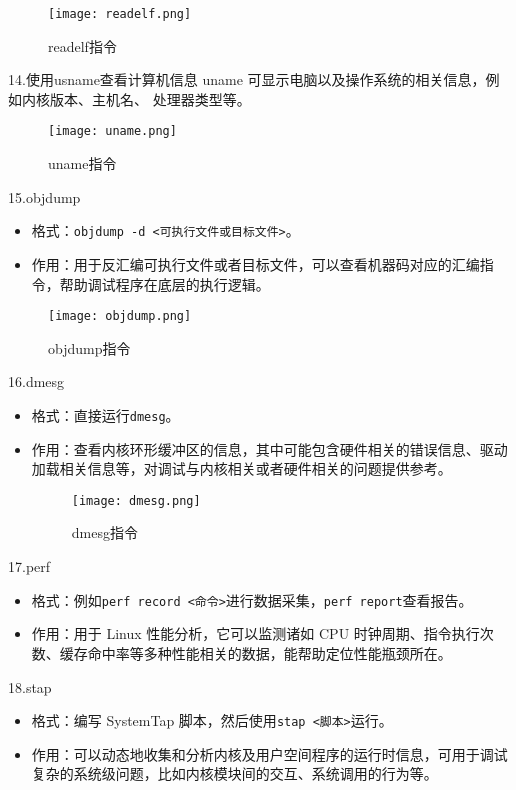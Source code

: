\documentclass{article}
\begin{document}
\begin{figure}[!h]
    \centering
    \texttt{[image: readelf.png]}
    \caption{readelf指令}
    \label{fig:enter-label}
\end{figure}


14.使用usname查看计算机信息
uname 可显示电脑以及操作系统的相关信息，例如内核版本、主机名、 处理器类型等。
\begin{figure}[!h]
    \centering
    \texttt{[image: uname.png]}
    \caption{uname指令}
    \label{fig:enter-label}
\end{figure}

15.objdump

\begin{itemize}
    \item 格式：\verb|objdump -d <可执行文件或目标文件>|。
    \item 作用：用于反汇编可执行文件或者目标文件，可以查看机器码对应的汇编指令，帮助调试程序在底层的执行逻辑。
\end{itemize}
 
\begin{figure}[!h]
    \centering
    \texttt{[image: objdump.png]}
    \caption{objdump指令}
    \label{fig:enter-label}
\end{figure}


16.dmesg
\begin{itemize}
    \item 格式：直接运行\verb|dmesg|。
    \item 作用：查看内核环形缓冲区的信息，其中可能包含硬件相关的错误信息、驱动加载相关信息等，对调试与内核相关或者硬件相关的问题提供参考。
\begin{figure}[!h]
    \centering
    \texttt{[image: dmesg.png]}
    \caption{dmesg指令}
    \label{fig:enter-label}
\end{figure}
\end{itemize}
 
17.perf

\begin{itemize}
    \item 格式：例如\verb|perf record <命令>|进行数据采集，\verb|perf report|查看报告。
    \item 作用：用于 Linux 性能分析，它可以监测诸如 CPU 时钟周期、指令执行次数、缓存命中率等多种性能相关的数据，能帮助定位性能瓶颈所在。
\end{itemize}
 
18.stap 

\begin{itemize}
    \item 格式：编写 SystemTap 脚本，然后使用\verb|stap <脚本>|运行。
    \item 作用：可以动态地收集和分析内核及用户空间程序的运行时信息，可用于调试复杂的系统级问题，比如内核模块间的交互、系统调用的行为等。
\end{itemize}
 
\end{document}
